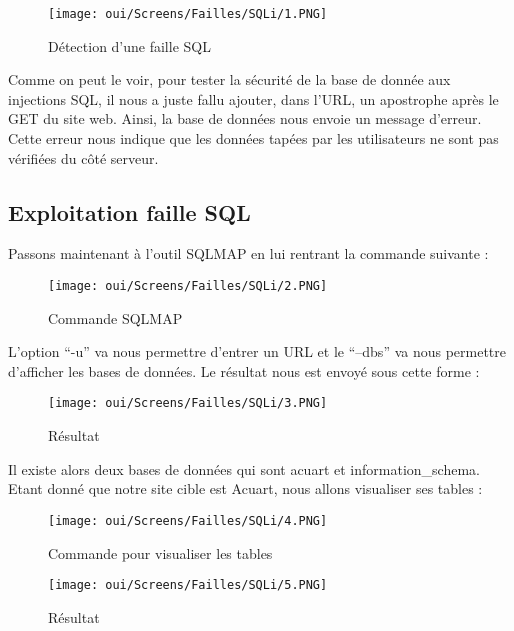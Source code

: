 \begin{figure}[htp!]
  \centering
  \setlength\figureheight{7cm}
  \setlength\figurewidth{9cm}
  \texttt{[image: oui/Screens/Failles/SQLi/1.PNG]}
  \caption{Détection d'une faille SQL}
  \label{fig:courbe-tikz}
\end{figure}

Comme on peut le voir, pour tester la sécurité de la base de donnée aux injections SQL, il nous a juste fallu ajouter, dans l'URL, un apostrophe après le GET du site web. Ainsi, la base de données nous envoie un message d’erreur. Cette erreur nous indique que les données tapées par les utilisateurs ne sont pas vérifiées du côté serveur.

\subsection{Exploitation faille SQL}

Passons maintenant à l’outil SQLMAP en lui rentrant la commande suivante :

\begin{figure}[htp!]
  \centering
  \setlength\figureheight{7cm}
  \setlength\figurewidth{9cm}
  \texttt{[image: oui/Screens/Failles/SQLi/2.PNG]}
  \caption{Commande SQLMAP}
  \label{fig:courbe-tikz}
\end{figure}

L’option “-u” va nous permettre d’entrer un URL et le “--dbs” va nous permettre d’afficher les bases de données. Le résultat nous est envoyé sous cette forme :

\begin{figure}[htp!]
  \centering
  \setlength\figureheight{7cm}
  \setlength\figurewidth{9cm}
  \texttt{[image: oui/Screens/Failles/SQLi/3.PNG]}
  \caption{Résultat}
  \label{fig:courbe-tikz}
\end{figure}

\newpage
Il existe alors deux bases de données qui sont acuart et information\_schema. Etant donné que notre site cible est Acuart, nous allons visualiser ses tables :

\begin{figure}[htp!]
  \centering
  \setlength\figureheight{7cm}
  \setlength\figurewidth{9cm}
  \texttt{[image: oui/Screens/Failles/SQLi/4.PNG]}
  \caption{Commande pour visualiser les tables}
  \label{fig:courbe-tikz}
\end{figure}

\begin{figure}[htp!]
  \centering
  \setlength\figureheight{7cm}
  \setlength\figurewidth{9cm}
  \texttt{[image: oui/Screens/Failles/SQLi/5.PNG]}
  \caption{Résultat}
  \label{fig:courbe-tikz}
\end{figure}

